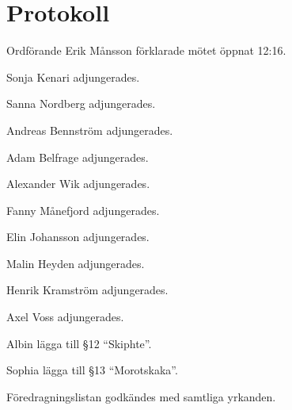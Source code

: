 \documentclass[10pt]{article}
\def\mo{Erik Månsson}
\begin{document}
\section*{Protokoll}
\begin{paragrafer}
Ordförande {\mo} förklarade mötet öppnat 12:16.

{\valavmo}

{\valavms}

{\valavj}

{\tosg}

Sonja Kenari adjungerades.

Sanna Nordberg adjungerades.

Andreas Bennström adjungerades.

Adam Belfrage adjungerades.

Alexander Wik  adjungerades.

Fanny Månefjord  adjungerades.

Elin Johansson adjungerades.

Malin Heyden  adjungerades.

Henrik Kramström adjungerades.

Axel Voss adjungerades.


Albin \ypa lägga till \S12 ``Skiphte''.

Sophia \ypa lägga till \S13 ``Morotskaka''.

Föredragningslistan godkändes med samtliga yrkanden.



\end{paragrafer}
\end{document}
